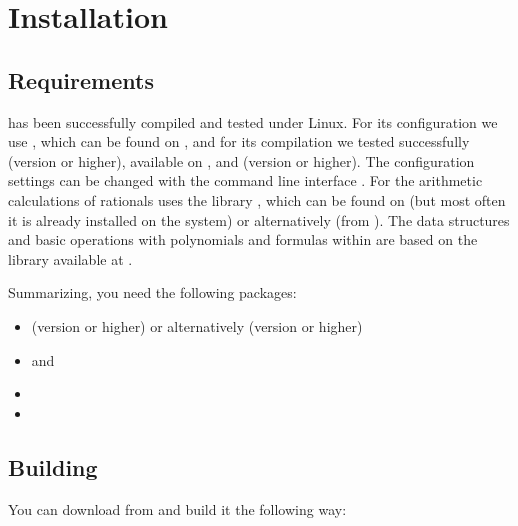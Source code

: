 \chapter{Installation}
\label{chapter:installation}
\section{Requirements}
\smtrat has been successfully compiled and tested under Linux.
For its configuration we use \cmake, which can be found on \cmakeURL, and for its compilation we tested successfully \gcc (version \gccVersion or higher), available on \gccURL, and \clang (version \clangVersion or higher). The configuration settings can be changed with the command line interface \ccmake.
For the arithmetic calculations of rationals \smtrat uses the \Cpp library \Gmp, which can be found on \gmpURL  (but most often it is already installed on the system) or alternatively \cln (from \clnURL).
The data structures and basic operations with polynomials and formulas within \smtrat are based on the \Cpp library \carl available at \carlURL.

Summarizing, you need the following packages:
\begin{itemize}
	\item \gcc (version \gccVersion or higher) or alternatively \clang (version \clangVersion or higher)
	\item \cmake and \ccmake
	\item \Gmp
	\item \Carl 
\end{itemize}


\section{Building %
	     \smtrat}
You can download \smtrat from \smtratURL and build it the following way:

